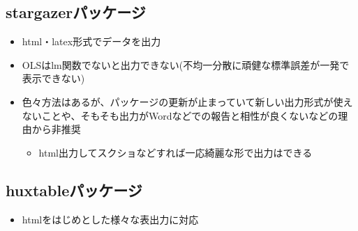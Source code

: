 \documentclass[
]{ltjsarticle}
\providecommand{\tightlist}{%
  \setlength{\itemsep}{0pt}\setlength{\parskip}{0pt}}
\begin{document}
\hypertarget{stargazerux30d1ux30c3ux30b1ux30fcux30b8}{%
\subsection{stargazerパッケージ}\label{stargazerux30d1ux30c3ux30b1ux30fcux30b8}}

\begin{itemize}
\tightlist
\item
  html・latex形式でデータを出力
\item
  OLSはlm関数でないと出力できない(不均一分散に頑健な標準誤差が一発で表示できない)
\item
  色々方法はあるが、パッケージの更新が止まっていて新しい出力形式が使えないことや、そもそも出力がWordなどでの報告と相性が良くないなどの理由から非推奨

  \begin{itemize}
  \tightlist
  \item
    html出力してスクショなどすれば一応綺麗な形で出力はできる
  \end{itemize}
\end{itemize}

\hypertarget{huxtableux30d1ux30c3ux30b1ux30fcux30b8}{%
\subsection{huxtableパッケージ}\label{huxtableux30d1ux30c3ux30b1ux30fcux30b8}}

\begin{itemize}
\tightlist
\item
  htmlをはじめとした様々な表出力に対応
\end{itemize}
\end{document}
